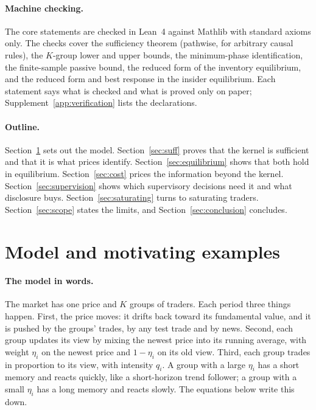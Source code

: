 \documentclass[12pt]{article}
\theoremstyle{definition}
\theoremstyle{remark}
\begin{document}
\paragraph{Machine checking.} The core statements are checked in Lean~4 against Mathlib with standard axioms only. The checks cover the sufficiency theorem (pathwise, for arbitrary causal rules), the $K$-group lower and upper bounds, the minimum-phase identification, the finite-sample passive bound, the reduced form of the inventory equilibrium, and the reduced form and best response in the insider equilibrium. Each statement says what is checked and what is proved only on paper; Supplement~\ref{app:verification} lists the declarations.

\paragraph{Outline.} Section~\ref{sec:model} sets out the model. Section~\ref{sec:suff} proves that the kernel is sufficient and that it is what prices identify. Section~\ref{sec:equilibrium} shows that both hold in equilibrium. Section~\ref{sec:cost} prices the information beyond the kernel. Section~\ref{sec:supervision} shows which supervisory decisions need it and what disclosure buys. Section~\ref{sec:saturating} turns to saturating traders. Section~\ref{sec:scope} states the limits, and Section~\ref{sec:conclusion} concludes.

\section{Model and motivating examples}\label{sec:model}

\paragraph{The model in words.} The market has one price and $K$ groups of traders. Each period three things happen. First, the price moves: it drifts back toward its fundamental value, and it is pushed by the groups' trades, by any test trade and by news. Second, each group updates its view by mixing the newest price into its running average, with weight $\eta_i$ on the newest price and $1-\eta_i$ on its old view. Third, each group trades in proportion to its view, with intensity $q_i$. A group with a large $\eta_i$ has a short memory and reacts quickly, like a short-horizon trend follower; a group with a small $\eta_i$ has a long memory and reacts slowly. The equations below write this down.
\end{document}
